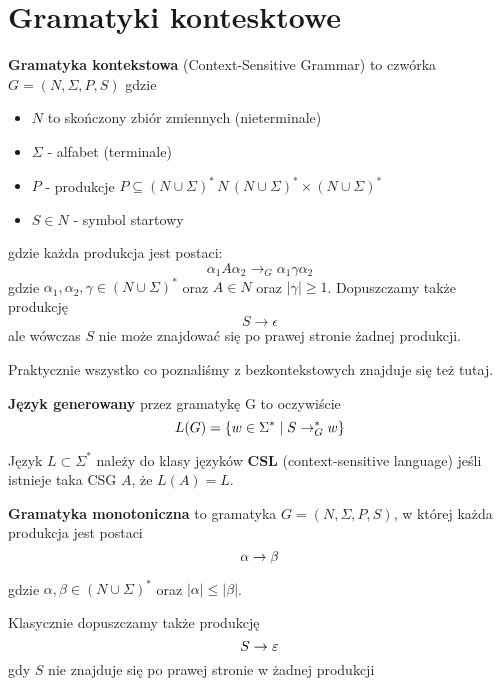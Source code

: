 \section{Gramatyki kontesktowe}

\begin{definition}
	\textbf{Gramatyka kontekstowa} (Context-Sensitive Grammar) to czwórka \( G = (N, \Sigma, P, S) \) gdzie
	\begin{itemize}
		\item \( N \) to skończony zbiór zmiennych (nieterminale)
		\item \( \Sigma \) - alfabet (terminale)
		\item \( P \) - produkcje \( P \subseteq
		      (N \cup \Sigma)^* \, N \,
		      (N \cup \Sigma)^* \times
		      (N \cup \Sigma)^* \)
		\item \( S \in N \) - symbol startowy
	\end{itemize}
\end{definition}
gdzie każda produkcja jest postaci:
\[
	\alpha_1 A \alpha_2 \rightarrow_G \alpha_1 \gamma \alpha_2
\]
gdzie \( \alpha_1, \alpha_2, \gamma \in (N \cup \Sigma)^* \) oraz \( A \in N \)
oraz \( |\gamma| \geq 1\). Dopuszczamy także produkcję
\[
	S \rightarrow \epsilon
\]
ale wówczas \( S \) nie może znajdować się po prawej stronie żadnej produkcji.

Praktycznie wszystko co poznaliśmy z bezkontekstowych znajduje się też tutaj.

\begin{definition}
	\textbf{Język  generowany} przez gramatykę G to oczywiście
	\[
		L(G) = \set{w \in \Sigma^* \mid S \rightarrow_G^* w}
	\]
\end{definition}

\begin{definition}
	Język \(L \subset \Sigma^*\) należy do klasy języków \textbf{CSL} (context-sensitive language) jeśli istnieje taka CSG \(A\), że \(L(A) = L\).
\end{definition}

\begin{definition}
	\textbf{Gramatyka monotoniczna} to gramatyka \( G = (N, \Sigma, P, S) \), w której
	każda produkcja jest postaci
	\[
		\alpha \rightarrow \beta \\
	\]
\end{definition}
gdzie \( \alpha, \beta \in (N \cup \Sigma)^* \) oraz \( |\alpha| \leq |\beta|\).

Klasycznie dopuszczamy także produkcję
\[
	S \rightarrow \varepsilon
\]
gdy \( S\) nie znajduje się po prawej stronie w żadnej produkcji

